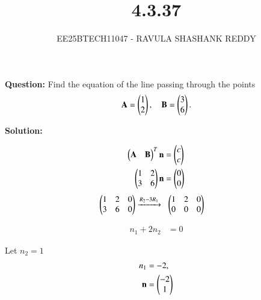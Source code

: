 \documentclass[journal]{article}
\begin{document}
	
	
	\vspace{3cm}
	
\title{4.3.37}
\author{EE25BTECH11047 - RAVULA SHASHANK REDDY}
\maketitle
\hrulefill
\bigskip 

\renewcommand{\thetable}{\theenumi}
\setlength{\intextsep}{10pt}

\textbf{Question:}  
Find the equation of the line passing through the points  
\[
\mathbf{A} = \begin{pmatrix}1 \\ 2\end{pmatrix}, 
\quad 
\mathbf{B} = \begin{pmatrix}3 \\ 6\end{pmatrix}.
\]

\textbf{Solution:}  

\begin{align}
\begin{pmatrix}\mathbf{A}&\mathbf{B}\end{pmatrix}^T\mathbf{n} &= \begin{pmatrix}c\\c\end{pmatrix}\\
\begin{pmatrix}1 & 2 \\ 3 & 6\end{pmatrix}\mathbf{n} &= \begin{pmatrix}0 \\ 0\end{pmatrix} 
\end{align}
\begin{align}
\begin{pmatrix}1 & 2 & 0 \\ 3 & 6 & 0\end{pmatrix} & 
\xrightarrow{R_2 - 3R_1}\;\;
\begin{pmatrix}1 & 2 & 0 \\ 0 & 0 & 0\end{pmatrix} 
\end{align}

\begin{align}
n_1 + 2n_2 &= 0 
\end{align}

Let $n_2=1$
\begin{align}
n_1 &= -2, \\
\mathbf{n} &= \begin{pmatrix}-2 \\ 1\end{pmatrix}
\end{align}
\end{document}
